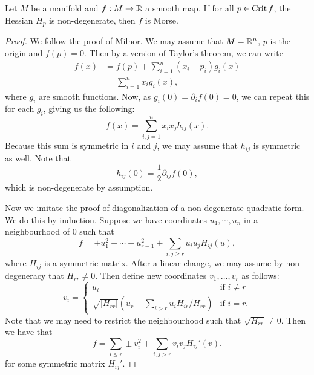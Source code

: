 \begin{lemma}
    Let $M$ be a manifold and $f: M \to  \mathbb{R}$ a smooth map.
    If for all $p \in \operatorname{Crit} f$, the Hessian $H_p$ is non-degenerate, then $f$ is Morse.
\end{lemma}
\begin{proof}
    We follow the proof of Milnor.
    We may assume that $M = \mathbb{R}^{n}$, $p$ is the origin and $f(p) = 0$.
    Then by a version of Taylor's theorem, we can write
    \begin{align*}
        f(x)  &= f(p) + \sum_{i=1}^{n} (x_i - p_i) g_i (x)\\
              &= \sum_{i=1}^{n} x_i g_i(x)
    ,\end{align*} 
    where $g_i$ are smooth functions. 
    Now, as $g_i(0) = \partial_i f (0) = 0$, we can repeat this for each  $g_i$, giving us the following:
    \[
        f(x) = \sum_{i, j= 1}^{n} x_i x_j h_{ij}(x)
    .\] 
    Because this sum is symmetric in $i$ and  $j$, we may assume that  $h_{ij}$ is symmetric as well.
    Note that
    \[
        h_{ij}(0) = \frac{1}{2} \partial_{ij} f(0)
    ,\]
    which is non-degenerate by assumption.

    Now we imitate the proof of diagonalization of a non-degenerate quadratic form.
    We do this by induction.
    Suppose we have coordinates $u_1, \cdots, u_n$ in a neighbourhood of $0$ such that
    \[
        f = \pm u_1^2 \pm \cdots \pm u_{r-1}^2 + \sum_{i,j\ge r} u_i u_j H_{ij}(u)
    ,\] 
    where $H_{ij}$ is a symmetric matrix.
    After a linear change, we may assume by non-degeneracy that $H_{rr} \neq 0$.
    Then define new coordinates $ v_1, \ldots, v_r$ as follows:
    \[
        v_i = \begin{cases}
            u_i & \text{if $i \neq r$}\\
            \sqrt{|H_{rr}|} (u_r + \sum_{i > r} u_i H_{ir} / H_{rr}) & \text{if $i = r$.}
        \end{cases}
    \] 
    Note that we may need to restrict the neighbourhood such that $\sqrt{H_{rr}} \neq 0$.
    Then we have that
    \[
        f = \sum_{i\le r} \pm v_i^2 + \sum_{i,j > r} v_i v_j H_{ij}'(v)
    .\] 
    for some symmetric matrix $H_{ij}'$.

\end{proof}

